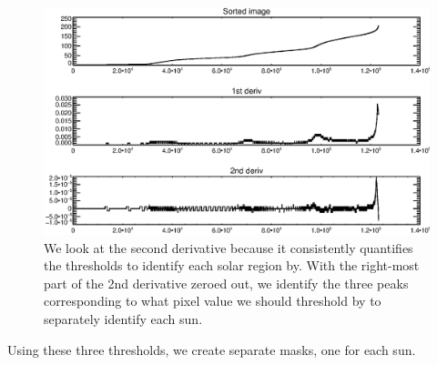 \documentclass[10pt]{scrartcl}
\begin{document}
\begin{figure}[!ht]
    \centering
    \includegraphics[width=.9\textwidth]{../plots_tables_images/sortedarray.eps}    
    \caption{We look at the second derivative because it consistently quantifies the thresholds to identify each solar region by. With the right-most part of the 2nd derivative zeroed out, we identify the three peaks corresponding to what pixel value we should threshold by to separately identify each sun.}
    \label{sortedarray}
\end{figure}

Using these three thresholds, we create separate masks, one for each sun. 
\end{document}
